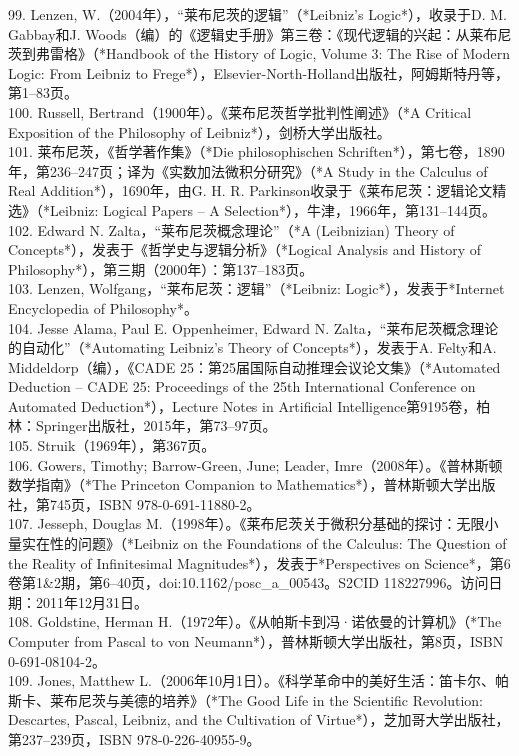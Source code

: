 99. Lenzen, W.（2004年），“莱布尼茨的逻辑”（*Leibniz's Logic*），收录于D. M. Gabbay和J. Woods（编）的《逻辑史手册》第三卷：《现代逻辑的兴起：从莱布尼茨到弗雷格》（*Handbook of the History of Logic, Volume 3: The Rise of Modern Logic: From Leibniz to Frege*），Elsevier-North-Holland出版社，阿姆斯特丹等，第1–83页。\\
100. Russell, Bertrand（1900年）。《莱布尼茨哲学批判性阐述》（*A Critical Exposition of the Philosophy of Leibniz*），剑桥大学出版社。\\
101. 莱布尼茨，《哲学著作集》（*Die philosophischen Schriften*），第七卷，1890年，第236–247页；译为《实数加法微积分研究》（*A Study in the Calculus of Real Addition*），1690年，由G. H. R. Parkinson收录于《莱布尼茨：逻辑论文精选》（*Leibniz: Logical Papers – A Selection*），牛津，1966年，第131–144页。\\
102. Edward N. Zalta，“莱布尼茨概念理论”（*A (Leibnizian) Theory of Concepts*），发表于《哲学史与逻辑分析》（*Logical Analysis and History of Philosophy*），第三期（2000年）：第137–183页。\\
103. Lenzen, Wolfgang，“莱布尼茨：逻辑”（*Leibniz: Logic*），发表于*Internet Encyclopedia of Philosophy*。\\
104. Jesse Alama, Paul E. Oppenheimer, Edward N. Zalta，“莱布尼茨概念理论的自动化”（*Automating Leibniz's Theory of Concepts*），发表于A. Felty和A. Middeldorp（编），《CADE 25：第25届国际自动推理会议论文集》（*Automated Deduction – CADE 25: Proceedings of the 25th International Conference on Automated Deduction*），Lecture Notes in Artificial Intelligence第9195卷，柏林：Springer出版社，2015年，第73–97页。\\
105. Struik（1969年），第367页。\\
106. Gowers, Timothy; Barrow-Green, June; Leader, Imre（2008年）。《普林斯顿数学指南》（*The Princeton Companion to Mathematics*），普林斯顿大学出版社，第745页，ISBN 978-0-691-11880-2。\\
107. Jesseph, Douglas M.（1998年）。《莱布尼茨关于微积分基础的探讨：无限小量实在性的问题》（*Leibniz on the Foundations of the Calculus: The Question of the Reality of Infinitesimal Magnitudes*），发表于*Perspectives on Science*，第6卷第1&2期，第6–40页，doi:10.1162/posc_a_00543。S2CID 118227996。访问日期：2011年12月31日。\\ 
108. Goldstine, Herman H.（1972年）。《从帕斯卡到冯·诺依曼的计算机》（*The Computer from Pascal to von Neumann*），普林斯顿大学出版社，第8页，ISBN 0-691-08104-2。\\
109. Jones, Matthew L.（2006年10月1日）。《科学革命中的美好生活：笛卡尔、帕斯卡、莱布尼茨与美德的培养》（*The Good Life in the Scientific Revolution: Descartes, Pascal, Leibniz, and the Cultivation of Virtue*），芝加哥大学出版社，第237–239页，ISBN 978-0-226-40955-9。\\
